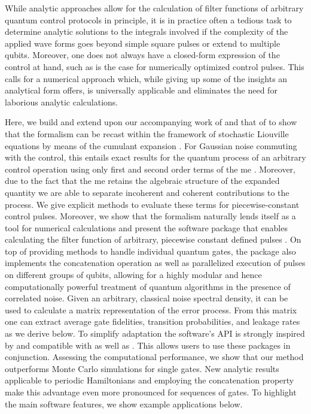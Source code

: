 While analytic approaches allow for the calculation of filter functions of arbitrary quantum control protocols in principle, it is in practice often a tedious task to determine analytic solutions to the integrals involved if the complexity of the applied wave forms goes beyond simple square pulses or extend to multiple qubits. Moreover, one does not always have a closed-form expression of the control at hand, such as is the case for numerically optimized control pulses. This calls for a numerical approach which, while giving up some of the insights an analytical form offers, is universally applicable and eliminates the need for laborious analytic calculations.

Here, we build and extend upon our accompanying work of  and that of  to show that the formalism can be recast within the framework of stochastic Liouville equations by means of the cumulant expansion \cite{Kubo1962,Kubo1963,Fox1976,Bianucci2020}. For Gaussian noise commuting with the control, this entails exact results for the quantum process of an arbitrary control operation using only first and second order terms of the \gls{me} \cite{Magnus1954}. Moreover, due to the fact that the \gls{me} retains the algebraic structure of the expanded quantity \cite{Blanes2009} we are able to separate incoherent and coherent contributions to the process. We give explicit methods to evaluate these terms for piecewise-constant control pulses. Moreover, we show that the formalism naturally lends itself as a tool for numerical calculations and present the \filterfunctions \python software package that enables calculating the filter function of arbitrary, piecewise constant defined pulses \cite{software}. On top of providing methods to handle individual quantum gates, the package also implements the concatenation operation as well as parallelized execution of pulses on different groups of qubits, allowing for a highly modular and hence computationally powerful treatment of quantum algorithms in the presence of correlated noise. Given an arbitrary, classical noise spectral density, it can be used to calculate a matrix representation of the error process. From this matrix one can extract average gate fidelities, transition probabilities, and leakage rates as we derive below. To simplify adaptation the software's API is strongly inspired by and compatible with \qutip \cite{Johansson2013} as well as \qopt \cite{Teske2021}. This allows users to use these packages in conjunction. Assessing the computational performance, we show that our method outperforms Monte Carlo simulations for single gates. New analytic results applicable to periodic Hamiltonians and employing the concatenation property make this advantage even more pronounced for sequences of gates. To highlight the main software features, we show example applications below.


